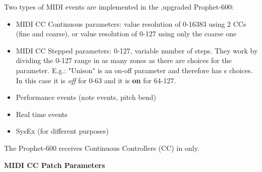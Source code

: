 Two types of MIDI events are implemented in the ,upgraded Prophet-600:

\begin{itemize}
  \setlength\itemsep{0cm}
  \item MIDI CC Continuous parameters: value resolution of 0-16383 using 2 CCs (fine and coarse), or value resolution of 0-127 using only the coarse one
  \item MIDI CC Stepped parameters: 0-127, variable number of steps. They work by dividing the 0-127 range in as many zones as there are choices for the parameter. E.g.: "Unison" is an on-off parameter and therefore has s choices. In this case it is \textit{off} for 0-63 and it is \textbf{on} for 64-127.
  \item Performance events (note events, pitch bend)
  \item Real time events
  \item SysEx (for different purposes)
\end{itemize}

The Prophet-600 receives Continuous Controllers (CC) in \presetmode only. 

\textbf{MIDI CC Patch Parameters} 

\footnotesize
\renewcommand{\arraystretch}{1.3}


